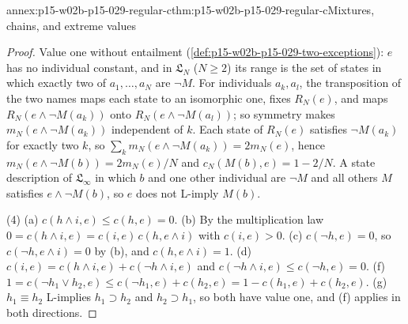 \begin{annexitem}{annex:p15-w02b-p15-029-regular-c}{thm:p15-w02b-p15-029-regular-c}{Mixtures, chains, and extreme values}
\begin{proof}
Value one without entailment
(\cref{def:p15-w02b-p15-029-two-exceptions}): \(e\) has no individual
constant, and in \(\mathfrak L_N\) (\(N\geq2\)) its range is the set of
states in which exactly two of \(a_1,\ldots,a_N\) are \(\neg M\). For
individuals \(a_k,a_l\), the transposition of the two names maps each
state to an isomorphic one, fixes \(R_N(e)\), and maps
\(R_N(e\land\neg M(a_k))\) onto \(R_N(e\land\neg M(a_l))\); so
symmetry makes \(m_N(e\land\neg M(a_k))\) independent of \(k\). Each
state of \(R_N(e)\) satisfies \(\neg M(a_k)\) for exactly two \(k\), so
\(\sum_km_N(e\land\neg M(a_k))=2m_N(e)\), hence
\(m_N(e\land\neg M(b))=2m_N(e)/N\) and \(c_N(M(b),e)=1-2/N\). A state
description of \(\mathfrak L_\infty\) in which \(b\) and one other
individual are \(\neg M\) and all others \(M\) satisfies \(e\land\neg
M(b)\), so \(e\) does not L-imply \(M(b)\).

(4) (a) \(c(h\land i,e)\leq c(h,e)=0\). (b) By the multiplication law
\(0=c(h\land i,e)=c(i,e)\,c(h,e\land i)\) with \(c(i,e)>0\). (c)
\(c(\neg h,e)=0\), so \(c(\neg h,e\land i)=0\) by (b), and
\(c(h,e\land i)=1\). (d) \(c(i,e)=c(h\land i,e)+c(\neg h\land i,e)\)
and \(c(\neg h\land i,e)\leq c(\neg h,e)=0\). (f)
\(1=c(\neg h_1\lor h_2,e)\leq c(\neg h_1,e)+c(h_2,e)=1-c(h_1,e)+c(h_2,e)\).
(g) \(h_1\equiv h_2\) L-implies \(h_1\supset h_2\) and
\(h_2\supset h_1\), so both have value one, and (f) applies in both
directions.
\end{proof}
\end{annexitem}

